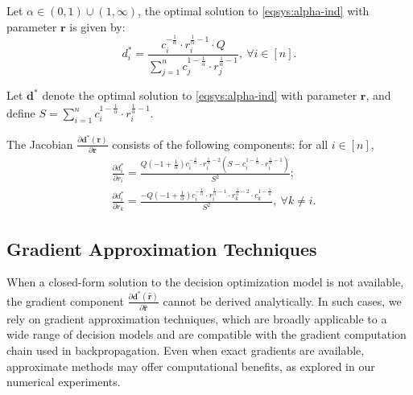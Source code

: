 \documentclass[ijoc,sglanonrev]{informs4}
\begin{document}
\begin{proposition} 
\label{prop:closed_form_solution-1}
Let $\alpha \in (0, 1) \cup (1, \infty)$, the optimal solution to \eqref{eqsys:alpha-ind} with parameter $\mathbf{r}$ is given by:
\[
d_i^* = \frac{c_i^{-\frac{1}{\alpha}} \cdot r_i^{\frac{1}{\alpha} - 1} \cdot Q}{\sum_{j=1}^n c_j^{1-\frac{1}{\alpha}} \cdot r_j^{\frac{1}{\alpha} - 1}}, ~\forall i \in [n].
\]
\end{proposition}

\begin{proposition} 
\label{prop:analytical_gradient-1}
Let $\mathbf{d}^*$ denote the optimal solution to \eqref{eqsys:alpha-ind} with parameter $\mathbf{r}$, and define $S = \sum_{i=1}^n c_i^{1 - \frac{1}{\alpha}} \cdot r_i^{\frac{1}{\alpha}-1}$. 

The Jacobian $\frac{\partial \mathbf{d^*(\mathbf{r})}}{\partial \mathbf{r}}$ consists of the following components: for all $i \in [n]$,
\[
\begin{aligned}
    & \frac{\partial d_i^*}{\partial r_i} = \frac{Q \left( -1 + \frac{1}{\alpha} \right)c_i^{-\frac{1}{\alpha}} \cdot r_i^{\frac{1}{\alpha}-2} \left( S - c_i^{1-\frac{1}{\alpha}}\cdot r_i^{\frac{1}{\alpha}-1}\right)}{S^2}; \\
    & \frac{\partial d_i^*}{\partial r_k} = \frac{-Q  \left( -1 + \frac{1}{\alpha} \right)c_i^{-\frac{1}{\alpha}} \cdot r_i^{\frac{1}{\alpha}-1} \cdot r_k^{\frac{1}{\alpha}-2} \cdot c_k^{1-\frac{1}{\alpha}}}{S^2}, ~\forall k \neq i.
\end{aligned}
\]
\end{proposition}



\subsection{Gradient Approximation Techniques} \label{sec:alg-approx-grad}
When a closed-form solution to the decision optimization model is not available, the gradient component $\frac{\partial \mathbf{d}^*(\hat{\mathbf{r}})}{\partial \hat{\mathbf{r}}}$ cannot be derived analytically. In such cases, we rely on gradient approximation techniques, which are broadly applicable to a wide range of decision models and are compatible with the gradient computation chain used in backpropagation. Even when exact gradients are available, approximate methods may offer computational benefits, as explored in our numerical experiments.
\end{document}
